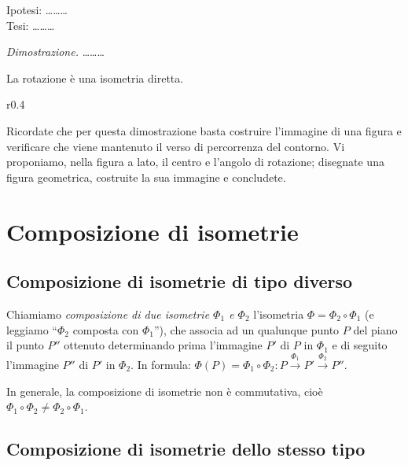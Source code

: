 \noindent Ipotesi: \ldots\ldots\ldots{}\\
Tesi: \ldots\ldots\ldots{}
    
\noindent\emph{Dimostrazione.} \ldots\ldots\ldots{}
    
\begin{teorema}
La rotazione è una isometria diretta.
\end{teorema}
    
\setlength{\intextsep}{3pt plus 2.0pt minus 2.0pt}
\begin{wrapfigure}{r}{0.4\textwidth}
  \centering
\end{wrapfigure}
Ricordate che per questa dimostrazione basta costruire l'immagine di 
una figura e verificare che viene mantenuto il verso di percorrenza 
del contorno. Vi proponiamo, nella figura a lato, il centro e 
l'angolo di rotazione; disegnate una figura geometrica, costruite la 
sua immagine e concludete.

    
\section{Composizione di isometrie}
\label{sect:composizione_isometrie}
    
\subsection{Composizione di isometrie di tipo diverso}
  
  
\begin{definizione}
Chiamiamo \emph{composizione di due isometrie \(\Phi_1\) e \(\Phi_2\)} 
l'isometria \(\Phi = \Phi_2 \circ \Phi_1\) (e leggiamo ``\(\Phi_2\) 
composta con \(\Phi_1\)''), che associa ad un qualunque punto \(P\) del 
piano il punto \(P''\) ottenuto determinando prima l'immagine \(P'\) di 
\(P\) in \(\Phi_1\) e di seguito l'immagine \(P''\) di \(P'\) in \(\Phi_2\). In 
formula: \(\Phi(P)=\Phi_1 \circ \Phi_2:P\overset{\Phi_1}\rightarrow P' 
\overset{\Phi_2}\rightarrow P''\).
\end{definizione}

In generale, la composizione di isometrie non è commutativa, cioè 
\(\Phi_1\circ\Phi_2 \neq \Phi_2\circ\Phi_1\).
      
      
\subsection{Composizione di isometrie dello stesso tipo}

